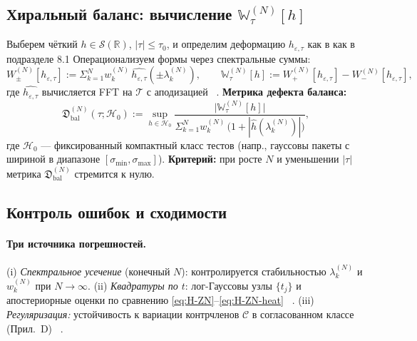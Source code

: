 \documentclass{article}
\numberwithin{equation}{section}
\theoremstyle{plain}
\theoremstyle{definition}
\theoremstyle{remark}
\def\infty{∞}\def\partial{∂}\def\sum{Σ}\def\int{∫}%
\begin{document}
\subsection*{Хиральный баланс: вычисление \(\mathbb W_\tau^{(N)}[h]\)}

Выберем чёткий \(h\in\mathcal S(\mathbb R)\), \(|\tau|\le \tau_0\), и определим деформацию \(h_{\varepsilon,\tau}\) как в как в подразделе 8.1
Операционализуем формы через спектральные суммы:
\begin{equation}\label{eq:H-W-plus-minus}
  W_\pm^{(N)}[h_{\varepsilon,\tau}]
  :=\sum_{k=1}^N w_k^{(N)}\,\widehat{h_{\varepsilon,\tau}}(\pm \lambda_k^{(N)}),\qquad
  \mathbb W_\tau^{(N)}[h]:=W_+^{(N)}[h_{\varepsilon,\tau}]-W_-^{(N)}[h_{\varepsilon,\tau}],
\end{equation}
где \(\widehat{h_{\varepsilon,\tau}}\) вычисляется FFT на \(\mathcal T\) с аподизацией ~\cite{Press2007}.
\textbf{Метрика дефекта баланса:}
\begin{equation}\label{eq:H-balance-defect}
  \mathfrak D_{\mathrm{bal}}^{(N)}(\tau; \mathcal H_0):=
  \sup_{h\in \mathcal H_0}\frac{\big|\mathbb W_\tau^{(N)}[h]\big|}{\sum_{k=1}^N w_k^{(N)}\,\big(1+|\widehat h(\lambda_k^{(N)})|\big)},
\end{equation}
где \(\mathcal H_0\) — фиксированный компактный класс тестов (напр., гауссовы пакеты с шириной в диапазоне \([\sigma_{\min},\sigma_{\max}]\)).
\textbf{Критерий:} при росте \(N\) и уменьшении \(|\tau|\) метрика \(\mathfrak D_{\mathrm{bal}}^{(N)}\) стремится к нулю.

\subsection*{Контроль ошибок и сходимости}

\paragraph{Три источника погрешностей.}
(i) \emph{Спектральное усечение} (конечный \(N\)): контролируется стабильностью \(\lambda_k^{(N)}\) и \(w_k^{(N)}\) при \(N\to\infty\).
(ii) \emph{Квадратуры по \(t\)}: лог-Гауссовы узлы \(\{t_j\}\) и апостериорные оценки по сравнению \eqref{eq:H-ZN}–\eqref{eq:H-ZN-heat} ~\cite{DavisRabinowitz1984}.
(iii) \emph{Регуляризация:} устойчивость к вариации контрчленов \(\mathcal C\) в согласованном классе (Прил.~D) ~\cite{Tikhonov1977}.

\end{document}
